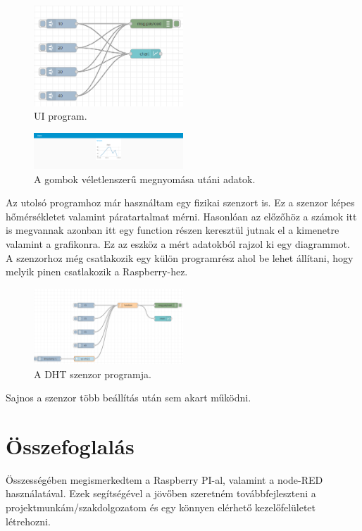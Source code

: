 \documentclass[a4paper,12pt,oneside]{report}
\begin{document}
\begin{figure}[htbp]
	\centering
	\includegraphics[width=0.5\textwidth]{fig/uichart.png}
	\caption{UI program.}
	\label{fig-uichart}
\end{figure}

\begin{figure}[htbp]
	\centering
	\includegraphics[width=0.5\textwidth]{fig/chart.png}
	\caption{A gombok véletlenszerű megnyomása utáni adatok.}
	\label{fig-chart}
\end{figure}

Az utolsó programhoz már használtam egy fizikai szenzort is. Ez a szenzor képes hőmérsékletet valamint páratartalmat mérni.
Hasonlóan az előzőhöz a számok itt is megvannak azonban itt egy function részen keresztül jutnak el a kimenetre valamint a 
grafikonra. Ez az eszköz a mért adatokból rajzol ki egy diagrammot. A szenzorhoz még csatlakozik egy külön programrész ahol be lehet
állítani, hogy melyik pinen csatlakozik a Raspberry-hez.

\begin{figure}[htbp]
	\centering
	\includegraphics[width=0.5\textwidth]{fig/dht.png}
	\caption{A DHT szenzor programja.}
	\label{fig-dht}
\end{figure}

Sajnos a szenzor több beállítás után sem akart működni.

\chapter{Összefoglalás}

Összességében megismerkedtem a Raspberry PI-al, valamint a node-RED használatával. Ezek segítségével a jövőben szeretném 
továbbfejleszteni a projektmunkám/szakdolgozatom és egy könnyen elérhető kezelőfelületet létrehozni.
\end{document}
